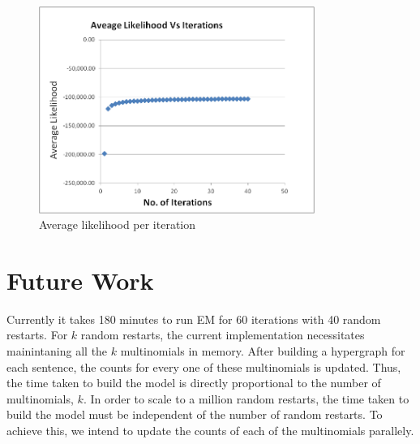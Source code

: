 \documentclass{book}
\begin{document}
\begin{figure}[!ht]
\centering
\includegraphics[width=90mm]{images/avg_likelihood.png}
\caption{Average likelihood per iteration}
\label{overflow}
\end{figure}


\section{Future Work}

Currently it takes 180 minutes to run EM for 60 iterations with 40 random restarts. For $k$ random restarts, the current implementation necessitates mainintaning all the $k$ multinomials in memory. After building a hypergraph for each sentence, the counts for every one of these multinomials is updated. Thus, the time taken to build the model is directly proportional to the number of multinomials, $k$. In order to scale to a million random restarts, the time taken to build the model must be independent of the number of random restarts. To achieve this, we intend to update the counts of each of the multinomials parallely.

%


\end{document}
